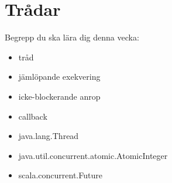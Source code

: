 \chapter{Trådar}\label{chapter:W12}
Begrepp du ska lära dig denna vecka:
\begin{itemize}[noitemsep,label={$\square$},leftmargin=*]
\item tråd
\item jämlöpande exekvering
\item icke-blockerande anrop
\item callback
\item java.lang.Thread
\item java.util.concurrent.atomic.AtomicInteger
\item scala.concurrent.Future\end{itemize}
